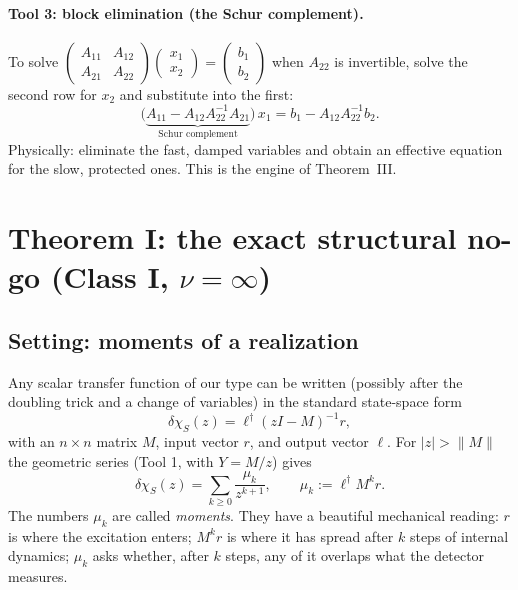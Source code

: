 \documentclass[11pt]{article}
\begin{document}
\paragraph{Tool 3: block elimination (the Schur complement).}
To solve
$\left(\begin{smallmatrix}A_{11}&A_{12}\\A_{21}&A_{22}\end{smallmatrix}\right)
\left(\begin{smallmatrix}x_1\\x_2\end{smallmatrix}\right)
=\left(\begin{smallmatrix}b_1\\b_2\end{smallmatrix}\right)$
when $A_{22}$ is invertible, solve the second row for $x_2$ and substitute
into the first:
\[
\big(\underbrace{A_{11}-A_{12}A_{22}^{-1}A_{21}}_{\text{Schur complement}}\big)\,x_1
= b_1-A_{12}A_{22}^{-1}b_2 .
\]
Physically: eliminate the fast, damped variables and obtain an effective
equation for the slow, protected ones.  This is the engine of
Theorem~III.

\section{Theorem I: the exact structural no-go (Class I, $\nu=\infty$)}
\label{sec:thm1}

\subsection{Setting: moments of a realization}

Any scalar transfer function of our type can be written (possibly after the
doubling trick and a change of variables) in the standard state-space form
\begin{equation}
\delta\chi_S(z)=\ell^\dagger (zI-M)^{-1} r,
\label{eq:realization}
\end{equation}
with an $n\times n$ matrix $M$, input vector $r$, and output vector $\ell$.
For $|z|>\|M\|$ the geometric series (Tool 1, with $Y=M/z$) gives
\[
\delta\chi_S(z)=\sum_{k\ge0}\frac{\mu_k}{z^{k+1}},
\qquad
\mu_k:=\ell^\dagger M^k r .
\]
The numbers $\mu_k$ are called \emph{moments}.  They have a beautiful
mechanical reading: $r$ is where the excitation enters; $M^k r$ is where it
has spread after $k$ steps of internal dynamics; $\mu_k$ asks whether, after
$k$ steps, any of it overlaps what the detector measures.
\end{document}
